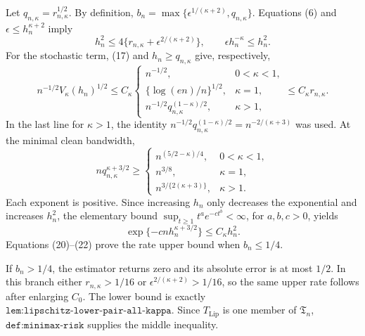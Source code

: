 Let \(q_{n,\kappa}=r_{n,\kappa}^{1/2}\). By definition, \(b_n=\max\{\epsilon^{1/(\kappa+2)},q_{n,\kappa}\}\). Equations (6) and \(\epsilon\leq h_n^{\kappa+2}\) imply
\[
h_n^2\leq4\{r_{n,\kappa}+\epsilon^{2/(\kappa+2)}\},
\qquad
\epsilon h_n^{-\kappa}\leq h_n^2.
\tag{20}
\]
For the stochastic term, (17) and \(h_n\geq q_{n,\kappa}\) give, respectively,
\[
n^{-1/2}V_\kappa(h_n)^{1/2}
\leq C_\kappa
\begin{cases}
n^{-1/2},&0<\kappa<1,\\
\{\log(en)/n\}^{1/2},&\kappa=1,\\
n^{-1/2}q_{n,\kappa}^{(1-\kappa)/2},&\kappa>1,
\end{cases}
\leq C_\kappa r_{n,\kappa}.
\tag{21}
\]
In the last line for \(\kappa>1\), the identity
\(n^{-1/2}q_{n,\kappa}^{(1-\kappa)/2}=n^{-2/(\kappa+3)}\) was used. At the minimal clean bandwidth,
\[
nq_{n,\kappa}^{\kappa+3/2}\geq
\begin{cases}
n^{(5/2-\kappa)/4},&0<\kappa<1,\\
n^{3/8},&\kappa=1,\\
n^{3/\{2(\kappa+3)\}},&\kappa>1.
\end{cases}
\]
Each exponent is positive. Since increasing \(h_n\) only decreases the exponential and increases \(h_n^2\), the elementary bound \(\sup_{t\geq1}t^a e^{-ct^b}<\infty\), for \(a,b,c>0\), yields
\[
\exp\{-cnh_n^{\kappa+3/2}\}\leq C_\kappa h_n^2.
\tag{22}
\]
Equations (20)--(22) prove the rate upper bound when \(b_n\leq1/4\).

If \(b_n>1/4\), the estimator returns zero and its absolute error is at most \(1/2\). In this branch either \(r_{n,\kappa}>1/16\) or \(\epsilon^{2/(\kappa+2)}>1/16\), so the same upper rate follows after enlarging \(C_0\). The lower bound is exactly \(\texttt{lem:lipschitz-lower-pair-all-kappa}\). Since \(T_{\mathrm{Lip}}\) is one member of \(\mathfrak T_n\), \(\texttt{def:minimax-risk}\) supplies the middle inequality.


